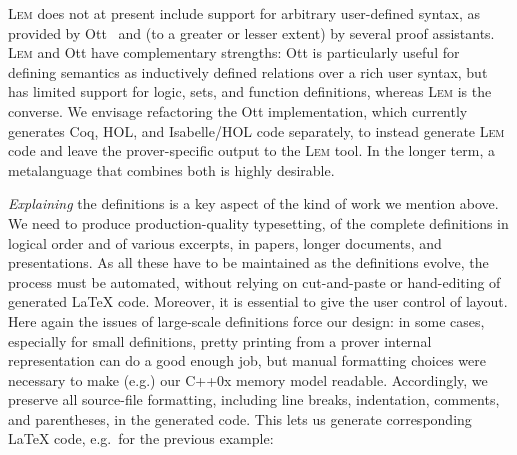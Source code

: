 \documentclass[a4paper]{llncs}
\newcommand{\myparagraph}[1]{\vspace{0.5\baselineskip}\par\noindent{\normalsize\bfseries{#1}}\quad}
\newcommand{\toolname}{\textsc{Lem}}
\begin{document}
\toolname{} does not at present include support for arbitrary
user-defined syntax, as provided by Ott~\cite{ott} and (to a greater or lesser
extent) by several proof assistants.  
%
\toolname{} and Ott have complementary strengths:  Ott is particularly
useful for defining semantics as inductively defined relations over a
rich user syntax, but has limited support for logic, sets, and
function definitions, whereas \toolname{} is the converse.  
We envisage refactoring the Ott implementation, which currently
generates
Coq, HOL, and Isabelle/HOL code separately, to instead generate
\toolname{} code and leave the prover-specific output to the \toolname{}
tool.  In the longer term, a metalanguage that combines both is highly desirable.





\myparagraph{2. Taking the source text seriously}
\emph{Explaining} the definitions is a key aspect of the kind of work we mention above.
%
We need to produce production-quality typesetting, of
the complete definitions in logical order and of various excerpts, in
papers, longer documents, and presentations.  As all these have to be
maintained as the definitions evolve, the process must be automated,
without relying on cut-and-paste or hand-editing of generated LaTeX
code.
%
Moreover, it is essential to give the user control of layout.
Here again the issues of large-scale definitions force our design: in
some cases, especially for small definitions, pretty printing from a
prover internal representation can do a good enough job, but manual formatting choices were necessary to make
(e.g.) our C++0x memory model readable. 
%
Accordingly, we preserve all
source-file formatting, including line breaks, indentation, comments, and parentheses,
in the generated code.  This lets us generate corresponding LaTeX code, e.g.~for the previous example:
\end{document}
